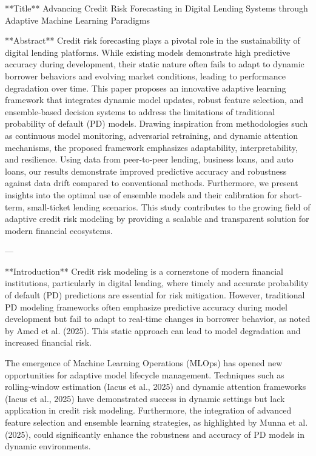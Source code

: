 **Title**  
Advancing Credit Risk Forecasting in Digital Lending Systems through Adaptive Machine Learning Paradigms  

**Abstract**  
Credit risk forecasting plays a pivotal role in the sustainability of digital lending platforms. While existing models demonstrate high predictive accuracy during development, their static nature often fails to adapt to dynamic borrower behaviors and evolving market conditions, leading to performance degradation over time. This paper proposes an innovative adaptive learning framework that integrates dynamic model updates, robust feature selection, and ensemble-based decision systems to address the limitations of traditional probability of default (PD) models. Drawing inspiration from methodologies such as continuous model monitoring, adversarial retraining, and dynamic attention mechanisms, the proposed framework emphasizes adaptability, interpretability, and resilience. Using data from peer-to-peer lending, business loans, and auto loans, our results demonstrate improved predictive accuracy and robustness against data drift compared to conventional methods. Furthermore, we present insights into the optimal use of ensemble models and their calibration for short-term, small-ticket lending scenarios. This study contributes to the growing field of adaptive credit risk modeling by providing a scalable and transparent solution for modern financial ecosystems.  

---

**Introduction**  
Credit risk modeling is a cornerstone of modern financial institutions, particularly in digital lending, where timely and accurate probability of default (PD) predictions are essential for risk mitigation. However, traditional PD modeling frameworks often emphasize predictive accuracy during model development but fail to adapt to real-time changes in borrower behavior, as noted by Amed et al. (2025). This static approach can lead to model degradation and increased financial risk.  

The emergence of Machine Learning Operations (MLOps) has opened new opportunities for adaptive model lifecycle management. Techniques such as rolling-window estimation (Iacus et al., 2025) and dynamic attention frameworks (Iacus et al., 2025) have demonstrated success in dynamic settings but lack application in credit risk modeling. Furthermore, the integration of advanced feature selection and ensemble learning strategies, as highlighted by Munna et al. (2025), could significantly enhance the robustness and accuracy of PD models in dynamic environments.  

